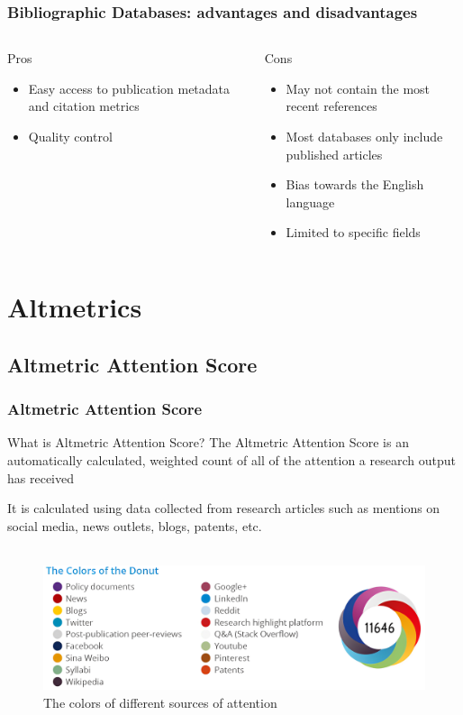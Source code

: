 \documentclass{beamer}
\newcommand{\pros}{\item[{\textcolor[HTML]{3C8031}{\ding{51}}}]}
\newcommand{\cons}{\item[\textcolor{red}{\ding{54}}]}
\begin{document}
\begin{frame}
    \frametitle{Bibliographic Databases: advantages and disadvantages}
    \begin{columns}[T]
        \begin{column}{.5\textwidth}
            \centering Pros
            \begin{itemize}[<+->]
                \pros Easy access to publication metadata and citation metrics
                \pros Quality control
            \end{itemize}
        \end{column}
        \begin{column}{.5\textwidth}
            \centering Cons
            \begin{itemize}[<+->]
                \cons May not contain the most recent references
                \cons Most databases only include published articles
                \cons Bias towards the English language
                \cons Limited to specific fields
            \end{itemize}
        \end{column}
    \end{columns}
\end{frame}


\section{Altmetrics}
\subsection{Altmetric Attention Score}
\begin{frame}
    \frametitle{Altmetric Attention Score}
    \begin{block}{What is Altmetric Attention Score?}
        The Altmetric Attention Score is an automatically calculated, weighted count of all of the attention a research output has received
    \end{block}

    It is calculated using data collected from research articles such as mentions
    on social media, news outlets, blogs, patents, etc.\\~\

    \begin{figure}[h]
        \includegraphics[height=0.42\textheight]{altscore.png}
        \caption{The colors of different sources of attention}
    \end{figure}
\end{frame}
\end{document}
